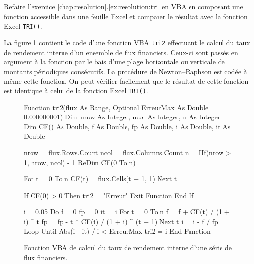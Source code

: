 \begin{exercice}
  Refaire l'exercice \ref{chap:resolution}.\ref{ex:resolution:tri} en VBA en composant une fonction
  accessible dans une feuille Excel et comparer le résultat avec la
  fonction Excel \texttt{TRI()}.
  \begin{sol}
    La figure \ref{fig:resolution:tri2} contient le code d'une fonction VBA
    \texttt{tri2} effectuant le calcul du taux de rendement interne
    d'un ensemble de flux financiers. Ceux-ci sont passés en argument
    à la fonction par le bais d'une plage horizontale ou verticale de
    montants périodiques consécutifs. La procédure de Newton--Raphson
    est codée à même cette fonction. On peut vérifier facilement que
    le résultat de cette fonction est identique à celui de la fonction
    Excel \texttt{TRI()}.
    \begin{figure}
      \centering
      \begin{framed}
\begin{Scode}
Function tri2(flux As Range, Optional ErreurMax
              As Double = 0.000000001)
    Dim nrow As Integer, ncol As Integer, n As Integer
    Dim CF() As Double, f As Double, fp As Double,
        i As Double, it As Double

    nrow = flux.Rows.Count
    ncol = flux.Columns.Count
    n = IIf(nrow > 1, nrow, ncol) - 1
    ReDim CF(0 To n)

    For t = 0 To n
        CF(t) = flux.Cells(t + 1, 1)
    Next t

    If CF(0) > 0 Then
        tri2 = "Erreur"
        Exit Function
    End If

    i = 0.05
    Do
        f = 0
        fp = 0
        it = i
        For t = 0 To n
            f = f + CF(t) / (1 + i) ^ t
            fp = fp - t * CF(t) / (1 + i) ^ (t + 1)
        Next t
        i = i - f / fp
    Loop Until Abs(i - it) / i < ErreurMax
    tri2 = i
End Function
\end{Scode}
      \end{framed}
      \caption{Fonction VBA de calcul du taux de rendement interne d'une
        série de flux financiers.}
      \label{fig:resolution:tri2}
    \end{figure}
  \end{sol}
\end{exercice}

